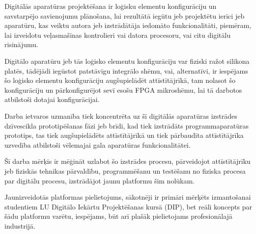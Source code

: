 Digitālās aparatūras projektēšana ir loģisku elementu konfigurāciju un savstarpējo savienojumu plānošana, lai
rezultātā iegūtu jeb projektētu ierīci jeb aparatūru, kas veiktu autora jeb izstrādātāja iedomāto funkcionalitāti, piemēram,
lai izveidotu veļasmašīnas kontrolieri vai datora procesoru, vai citu digitālu risinājumu.  
  
Digitālo aparatūru jeb tās loģisko elementu konfigurāciju var fiziski ražot silikona platēs, tādējādi iegūstot patstāvīgu integrālo
shēmu, vai, alternatīvi, ir iespējams šo loģisko elementu konfigurāciju augšupielādēt attīstītājrīkā, tam nolasot šo konfigurāciju un 
pārkonfigurējot sevī esošu FPGA mikroshēmu, lai tā darbotos atbilstoši dotajai konfigurācijai.  

Darba ietvaros uzmanība tiek koncentrēta uz šī digitālās aparatūras izstrādes dzīvescikla prototipēšanas fāzi jeb brīdi, kad
tiek izstrādāts programmaparatūras prototips, tas tiek augšupielādēts attīstītājrīkā un tiek pārbaudīta attīstītājrīka uzvedība
atbilstoši vēlemajai gala aparatūras funkcionalitātei.

Šī darba mērķis ir mēģināt uzlabot šo izstrādes procesu, pārveidojot attīstītājrīku jeb fiziskās tehnikas pārvaldību, programmēšanu 
un testēšanu no fiziska procesa par digitālu procesu, izstrādājot jaunu platformu šim nolūkam.

Jaunizveidotās platformas pielietojums, sākotnēji ir primāri mērķēts izmantošanai studentiem LU Digitālo Iekārtu Projektēšanas kursā (DIP),
bet reāli koncepts par šādu platformu varētu, iespējams, būt arī plašāk pielietojams profesionālajā industrijā.
  